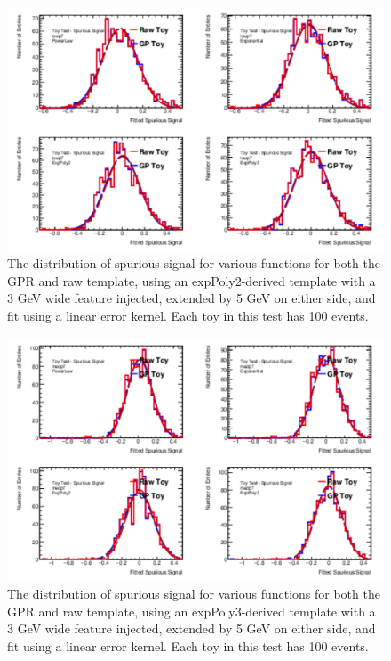 \begin{figure} 
\begin{center}
  \includegraphics[width=\textwidth]{figures/background/gpr/validation/linear/ToyTest_FitSigVals_lowpT_100_Sig}   
\caption{The distribution of spurious signal for various functions for both the GPR and raw template, using an expPoly2-derived template with a 3 GeV wide feature injected, extended by 5 GeV on either side, and fit using a linear error kernel. Each toy in this test has 100 events.}
\label{fig:linearkernel_lowpt_100_Sig}
\end{center}
\end{figure}

\begin{figure} 
\begin{center}
  \includegraphics[width=\textwidth]{figures/background/gpr/validation/linear/ToyTest_FitSigVals_medpT_100_Sig}   
\caption{The distribution of spurious signal for various functions for both the GPR and raw template, using an expPoly3-derived template with a 3 GeV wide feature injected, extended by 5 GeV on either side, and fit using a linear error kernel. Each toy in this test has 100 events.}
\label{fig:linearkernel_medpt_100_Sig}
\end{center}
\end{figure}

